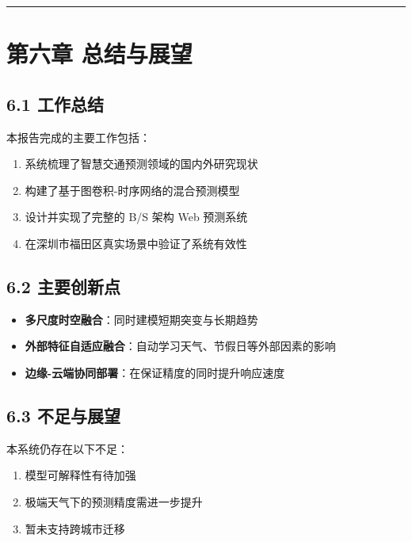 \documentclass{harryopo-mathnotes}
\begin{document}
\begin{center}\rule{0.5\linewidth}{0.5pt}\end{center}

\section{第六章
总结与展望}\label{ux7b2cux516dux7ae0-ux603bux7ed3ux4e0eux5c55ux671b}

\subsection{6.1 工作总结}\label{ux5de5ux4f5cux603bux7ed3}

本报告完成的主要工作包括：

\begin{enumerate}
\def\labelenumi{\arabic{enumi}.}
\tightlist
\item
  系统梳理了智慧交通预测领域的国内外研究现状
\item
  构建了基于图卷积-时序网络的混合预测模型
\item
  设计并实现了完整的 B/S 架构 Web 预测系统
\item
  在深圳市福田区真实场景中验证了系统有效性
\end{enumerate}

\subsection{6.2 主要创新点}\label{ux4e3bux8981ux521bux65b0ux70b9}

\begin{itemize}
\tightlist
\item
  \textbf{多尺度时空融合}：同时建模短期突变与长期趋势
\item
  \textbf{外部特征自适应融合}：自动学习天气、节假日等外部因素的影响
\item
  \textbf{边缘-云端协同部署}：在保证精度的同时提升响应速度
\end{itemize}

\subsection{6.3 不足与展望}\label{ux4e0dux8db3ux4e0eux5c55ux671b}

本系统仍存在以下不足：

\begin{enumerate}
\def\labelenumi{\arabic{enumi}.}
\tightlist
\item
  模型可解释性有待加强
\item
  极端天气下的预测精度需进一步提升
\item
  暂未支持跨城市迁移
\end{enumerate}
\end{document}

